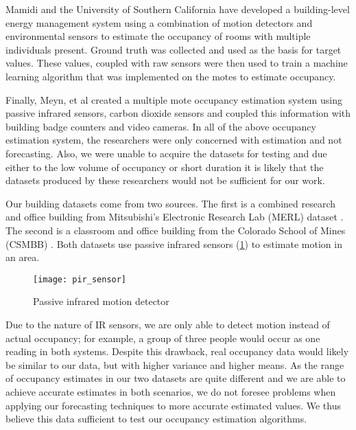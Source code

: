Mamidi \cite{mamidi2012} and the University of Southern California have developed a building-level energy management system using a combination of motion detectors and environmental sensors to estimate the occupancy of rooms with multiple individuals present.  Ground truth was collected and used as the basis for target values.  These values, coupled with raw sensors were then used to train a machine learning algorithm that was implemented on the motes to estimate occupancy.

Finally, Meyn, et al \cite{meyn2009} created a multiple mote occupancy estimation system using passive infrared sensors, carbon dioxide sensors and coupled this information with building badge counters and video cameras.  In all of the above occupancy estimation system, the researchers were only concerned with estimation and not forecasting.  Also, we were unable to acquire the datasets for testing and due either to the low volume of occupancy or short duration it is likely that the datasets produced by these researchers would not be sufficient for our work.

Our building datasets come from two sources.  The first is a combined research and office building from Mitsubishi's Electronic Research Lab (MERL) dataset \cite{Wren2007}.  The second is a classroom and office building from the Colorado School of Mines (CSMBB) \cite{Hoff2009, Howard2013}.  Both datasets use passive infrared sensors (\ref{fig:pirsensor}) to estimate motion in an area.  

\begin{figure}[h]
	\begin{center}
		\texttt{[image: pir\_sensor]}
	\end{center}
	\caption{Passive infrared motion detector}
	\label{fig:pirsensor}
\end{figure}

Due to the nature of IR sensors, we are only able to detect motion instead of actual occupancy; for example, a group of three people would occur as one reading in both systems.  Despite this drawback, real occupancy data would likely be similar to our data, but with higher variance and higher means.  As the range of occupancy estimates in our two datasets are quite different and we are able to achieve accurate estimates in both scenarios, we do not foresee problems when applying our forecasting techniques to more accurate estimated values.  We thus believe this data sufficient to test our occupancy estimation algorithms.

